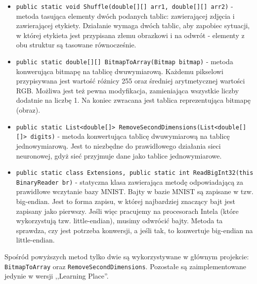 \documentclass[12pt,a4paper]{article}
\begin{document}
\begin{itemize}
    \item \lstinline{public static void Shuffle(double[][] arr1, double[][] arr2)} - metoda tasująca elementy dwóch podanych tablic: zawierającej zdjęcia i zawierającej etykiety. Działanie wymaga dwóch tablic, aby zapobiec sytuacji, w której etykieta jest przypisana złemu obrazkowi i na odwrót - elementy z obu struktur są tasowane równocześnie.
    \item \lstinline{public static double[][] BitmapToArray(Bitmap bitmap)} - metoda konwerująca bitmapę na tablicę dwuwymiarową. Każdemu pikselowi przypisywana jest wartość różnicy 255 oraz średniej arytmetycznej wartości RGB. Możliwa jest też pewna modyfikacja, zamieniająca wszystkie liczby dodatnie na liczbę 1. Na koniec zwracana jest tablica reprezentująca bitmapę (obraz).
    \item \lstinline{public static List<double[]> RemoveSecondDimensions(List<double[][]> digits)} - metoda konwertująca tablicę dwuwymiarową na tablicę jednowymiarową. Jest to niezbędne do prawidłowego działania sieci neuronowej, gdyż sieć przyjmuje dane jako tablice jednowymiarowe.
    \item \lstinline{public static class Extensions, public static int ReadBigInt32(this BinaryReader br)} - statyczna klasa zawierająca metodę odpowiadającą za prawidłowe wczytanie bazy MNIST. Bajty w bazie MNIST są zapisane w tzw. big-endian. Jest to forma zapisu, w której najbardziej znaczący bajt jest zapisany jako pierwszy. Jeśli więc pracujemy na procesorach Intela (które wykorzystują tzw. little-endian), musimy odwrócić bajty. Metoda ta sprawdza, czy jest potrzeba konwersji, a jeśli tak, to konwertuje big-endian na little-endian.
	\end{itemize}
	
Spośród powyższych metod tylko dwie są wykorzystywane w głównym projekcie: \\ \lstinline{BitmapToArray} oraz \lstinline{RemoveSecondDimensions}. Pozostałe są zaimplementowane jedynie w wersji ,,Learning Place''.
\end{document}
